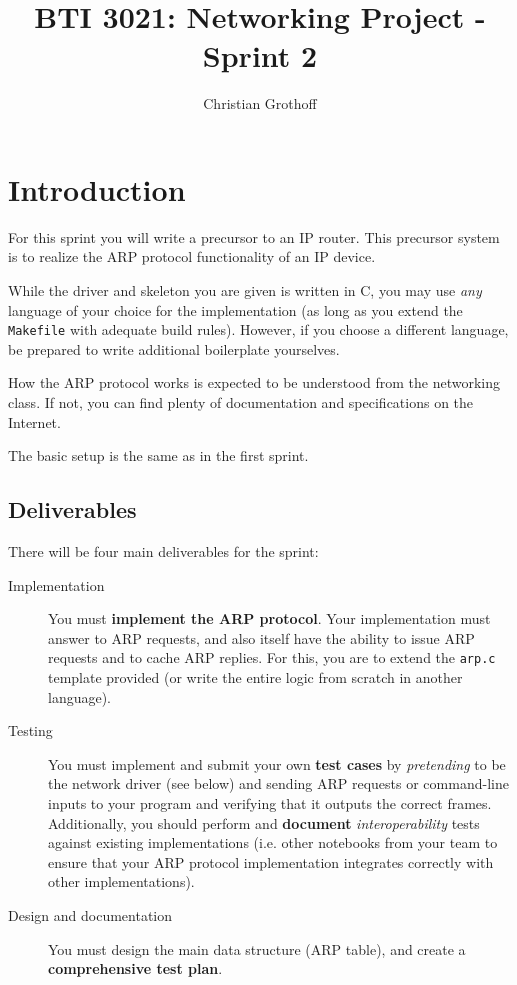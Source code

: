 \documentclass{article}
\title{BTI 3021: Networking Project - Sprint 2}
\author{Christian Grothoff}
\date{}
\begin{document}
\maketitle

\section{Introduction}

For this sprint you will write a precursor to an IP router.  This
precursor system is to realize the ARP protocol functionality of
an IP device.

While the driver and skeleton you are given is written in C, you may
use {\em any} language of your choice for the implementation (as long
as you extend the {\tt Makefile} with adequate build rules).  However,
if you choose a different language, be prepared to write additional
boilerplate yourselves.

How the ARP protocol works is expected to be understood from the
networking class. If not, you can find plenty of documentation and
specifications on the Internet.

The basic setup is the same as in the first sprint.

\subsection{Deliverables}

There will be four main deliverables for the sprint:
\begin{description}
\item[Implementation] You must {\bf implement the ARP protocol}. Your
  implementation must answer to ARP requests, and also itself
  have the ability to issue ARP requests and to cache ARP replies.
  For this, you are to extend the {\tt arp.c} template provided
  (or write the entire logic from scratch in another language).
\item[Testing] You must implement and submit your own {\bf test cases}
  by {\em pretending} to be the network driver (see below) and sending
  ARP requests or command-line inputs to your program and verifying that it
  outputs the correct frames. Additionally, you should perform and
  {\bf document} {\em interoperability} tests against existing
  implementations (i.e. other notebooks from your team to ensure that
  your ARP protocol implementation integrates correctly with other
  implementations).
\item[Design and documentation] You must design the main
  data structure (ARP table), and create a {\bf comprehensive test plan}.
\end{description}
\end{document}
